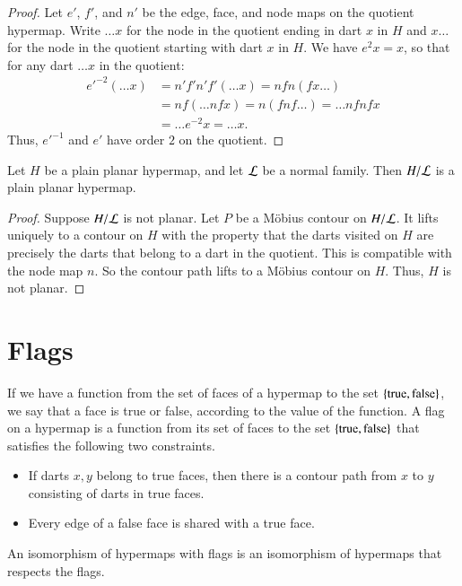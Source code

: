 \begin{proof} Let $e'$, $f'$, and $n'$ be the edge, face, and node maps on the
quotient hypermap.  Write $\ldots x$ for the node in the quotient
ending in dart $x$ in $H$ and $x\ldots$ for the node in the quotient
starting with dart $x$ in $H$.  We have $e^2 x = x$, so that for any
dart $\ldots x$ in the quotient:
    $$\begin{array}{lll}
    {e'}^{-2} (\ldots x) &= n' f' n' f' (\ldots x) = n f n (f x \ldots) \\&=
    n f (\ldots n f x) = n (f n f \ldots) = \ldots n f n f x\\ &=
    \ldots e^{-2} x = \ldots x.
    \end{array}$$
Thus, ${e'}^{-1}$ and $e'$ have order $2$ on the quotient.
\end{proof}

\begin{lemma} Let $H$ be a plain planar hypermap, and let $\cal L$
be a normal family.  Then $H/{\cal L}$ is a plain planar hypermap.
\end{lemma}

\begin{proof} Suppose $H/{\cal L}$ is not planar.
Let $P$ be a M\"obius contour on $H/{\cal L}$.  It lifts uniquely to
a contour on $H$ with the property that the darts visited on $H$ are
precisely the darts that belong to a dart in the quotient.  This is
compatible with the node map $n$.  So the contour path lifts to a
M\"obius contour on $H$.  Thus, $H$ is not planar.
\end{proof}

\section{Flags}

\begin{definition}  If we have a function from the set of faces of a hypermap
to the set $\{{\operatorname{true}},{\operatorname{false}}\}$, we say that a face is true or
false, according to the value of the function.  A flag on a hypermap
is a function from its set of faces to the set
$\{{\operatorname{true}},{\operatorname{false}}\}$ that satisfies the following two
constraints.
\begin{itemize}
    \item If darts $x,y$ belong to true faces,
    then there is a contour path from $x$ to $y$ consisting of darts
    in true faces.
    \item Every edge of a false face is shared with a true face.
    \end{itemize}
An isomorphism of hypermaps with flags is an isomorphism of
hypermaps that respects the flags.
\end{definition}

